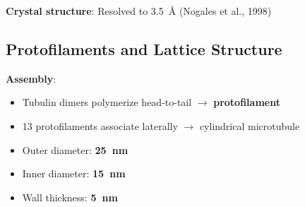 \textbf{Crystal structure}: Resolved to 3.5~Å (Nogales et al., 1998)

\subsection{Protofilaments and Lattice Structure}
\label{subsec:protofilaments-lattice}

\textbf{Assembly}:
\begin{itemize}
\item Tubulin dimers polymerize head-to-tail $\rightarrow$ \textbf{protofilament}
\item 13 protofilaments associate laterally $\rightarrow$ cylindrical microtubule
\item Outer diameter: \textbf{25~nm}
\item Inner diameter: \textbf{15~nm}
\item Wall thickness: \textbf{5~nm}
\end{itemize}

